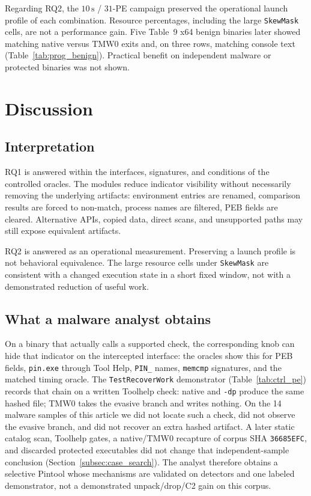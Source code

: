 \documentclass[pdflatex,sn-mathphys-num]{sn-jnl}
\theoremstyle{thmstyleone}
\theoremstyle{thmstyletwo}
\theoremstyle{thmstylethree}
\begin{document}
Regarding RQ2, the $10\,\mathrm{s}$ / $31$-PE campaign preserved the operational launch profile of each combination. Resource percentages, including the large \texttt{SkewMask} cells, are not a performance gain. Five Table~9 x64 benign binaries later showed matching native versus TMW0 exits and, on three rows, matching console text (Table~\ref{tab:prog_benign}). Practical benefit on independent malware or protected binaries was not shown.

\section{Discussion}
\label{sec:discussion}

\subsection{Interpretation}

RQ1 is answered within the interfaces, signatures, and conditions of the controlled oracles. The modules reduce indicator visibility without necessarily removing the underlying artifacts: environment entries are renamed, comparison results are forced to non-match, process names are filtered, PEB fields are cleared. Alternative APIs, copied data, direct scans, and unsupported paths may still expose equivalent artifacts.

RQ2 is answered as an operational measurement. Preserving a launch profile is not behavioral equivalence. The large resource cells under \texttt{SkewMask} are consistent with a changed execution state in a short fixed window, not with a demonstrated reduction of useful work.

\subsection{What a malware analyst obtains}

On a binary that actually calls a supported check, the corresponding knob can hide that indicator on the intercepted interface: the oracles show this for PEB fields, \texttt{pin.exe} through Tool Help, \texttt{PIN\_} names, \texttt{memcmp} signatures, and the matched timing oracle. The \texttt{TestRecoverWork} demonstrator (Table~\ref{tab:ctrl_pe}) records that chain on a written Toolhelp check: native and \texttt{-dp} produce the same hashed file; TMW0 takes the evasive branch and writes nothing. On the 14 malware samples of this article we did not locate such a check, did not observe the evasive branch, and did not recover an extra hashed artifact. A later static catalog scan, Toolhelp gates, a native/TMW0 recapture of corpus SHA \texttt{36685EFC}, and discarded protected executables did not change that independent-sample conclusion (Section~\ref{subsec:case_search}). The analyst therefore obtains a selective Pintool whose mechanisms are validated on detectors and one labeled demonstrator, not a demonstrated unpack/drop/C2 gain on this corpus.
\end{document}
